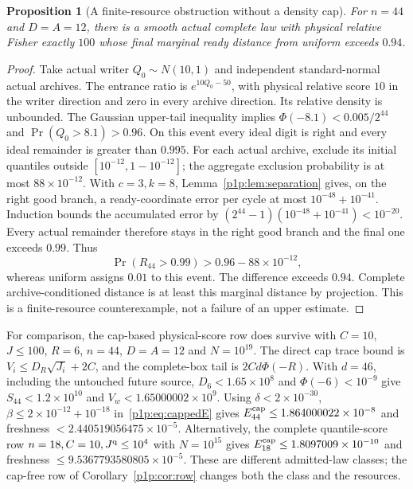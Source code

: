 \documentclass[11pt]{article}
\numberwithin{equation}{section}
\newtheorem{proposition}[theorem]{Proposition}
\theoremstyle{definition}
\theoremstyle{remark}
\begin{document}
\begin{proposition}[A finite-resource obstruction without a density cap]
\label{p1p:prop:nocapcounter}
For $n=44$ and $D=A=12$, there is a smooth actual complete law with
physical relative Fisher exactly $100$ whose final marginal ready
distance from uniform exceeds $0.94$.
\end{proposition}
\begin{proof}
Take actual writer $Q_0\sim N(10,1)$ and independent standard-normal
actual archives. The entrance ratio is $e^{10Q_0-50}$, with physical
relative score $10$ in the writer direction and zero in every archive
direction. Its relative density is unbounded.
The Gaussian upper-tail inequality implies
$\Phi(-8.1)<0.005/2^{44}$ and
$\Pr(Q_0>8.1)>0.96$. On this event every ideal digit is right and every
ideal remainder is greater than $0.995$. For each actual archive,
exclude its initial quantiles outside $[10^{-12},1-10^{-12}]$; the
aggregate exclusion probability is at most $88\times10^{-12}$.
With $c=3,k=8$, Lemma~\ref{p1p:lem:separation} gives, on the right good
branch, a ready-coordinate error per cycle at most
$10^{-48}+10^{-41}$. Induction bounds the accumulated error by
$(2^{44}-1)(10^{-48}+10^{-41})<10^{-20}$.
Every actual remainder therefore stays in the right good branch and
the final one exceeds $0.99$. Thus
\[
 \Pr(R_{44}>0.99)>0.96-88\times10^{-12},
\]
whereas uniform assigns $0.01$ to this event. The difference exceeds
$0.94$. Complete archive-conditioned distance is at least this marginal
distance by projection. This is a finite-resource counterexample, not
a failure of an upper estimate.
\end{proof}

For comparison, the cap-based physical-score row does survive with
$C=10$, $J\leq100$, $R=6$, $n=44$, $D=A=12$ and $N=10^{19}$.
The direct cap trace bound is
$V_i\leq D_R\sqrt{J_i}+2C$, and the complete-box tail is
$2Cd\Phi(-R)$. With $d=46$, including the untouched future source,
$D_6<1.65\times10^8$ and $\Phi(-6)<10^{-9}$ give
$S_{44}<1.2\times10^{10}$ and $V_w<1.65000002\times10^9$.
Using $\delta<2\times10^{-30}$,
$\beta\leq2\times10^{-12}+10^{-18}$ in~\eqref{p1p:eq:cappedE} gives
$E_{44}^{\rm cap}\leq1.864000022\times10^{-8}$ and freshness
$<2.440519056475\times10^{-5}$.
Alternatively, the complete quantile-score row $n=18,C=10,J^{\rm q}\leq10^4$
with $N=10^{15}$ gives $E_{18}^{\rm cap}\leq1.8097009\times10^{-10}$ and
freshness $\leq9.5367793580805\times10^{-5}$.
These are different admitted-law classes; the cap-free row of
Corollary~\ref{p1p:cor:row} changes both the class and the resources.
\end{document}
